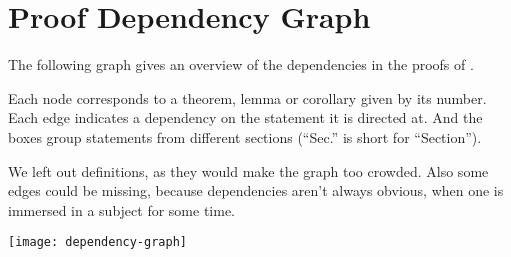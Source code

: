 \appendix
\section{Proof Dependency Graph}\label{sec:dependency-graph}

The following graph gives an overview of the dependencies in the proofs of \cite{shitov2020sublinear}.

Each node corresponds to a theorem, lemma or corollary given by its number.
Each edge indicates a dependency on the statement it is directed at. 
And the boxes group statements from different sections (``Sec.'' is short for ``Section'').

We left out definitions, as they would make the graph too crowded. 
Also some edges could be missing, because dependencies aren't always obvious, when one is immersed in a subject for some time.

\texttt{[image: dependency-graph]}

\newpage